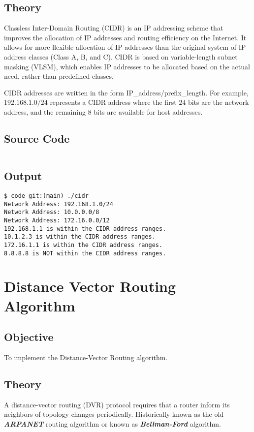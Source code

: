 \documentclass{korigamik}
\begin{document}
\subsection{Theory}
Classless Inter-Domain Routing (CIDR) is an IP addressing scheme that improves
the allocation of IP addresses and routing efficiency on the Internet. It
allows for more flexible allocation of IP addresses than the original system of
IP address classes (Class A, B, and C). CIDR is based on variable-length subnet
masking (VLSM), which enables IP addresses to be allocated based on the actual
need, rather than predefined classes.

CIDR addresses are written in the form IP\_address/prefix\_length. For example,
$192.168.1.0/24$ represents a CIDR address where the first $24$ bits are the
network address, and the remaining 8 bits are available for host addresses.

\subsection{Source Code}

\inputminted[firstline=9, fontsize=\footnotesize]{cpp}{code/cidr.cpp}

\subsection{Output}

\begin{lstlisting}[style=output]
$ code git:(main) ./cidr
Network Address: 192.168.1.0/24
Network Address: 10.0.0.0/8
Network Address: 172.16.0.0/12
192.168.1.1 is within the CIDR address ranges.
10.1.2.3 is within the CIDR address ranges.
172.16.1.1 is within the CIDR address ranges.
8.8.8.8 is NOT within the CIDR address ranges.
\end{lstlisting}

\iffalse
	\pagebreak

	\section{Distance Vector Routing Algorithm}
	\label{sec:Distance Vector Routing Algorithm}

	\subsection{Objective}
	To implement the Distance-Vector Routing algorithm.

	\subsection{Theory}
	A distance-vector routing (DVR) protocol requires that a router inform its
	neighbors of topology changes periodically. Historically known as the old
	\textbf{\textit{ARPANET}} routing algorithm or known as \textbf{\textit{Bellman-Ford}} algorithm.
\end{document}

